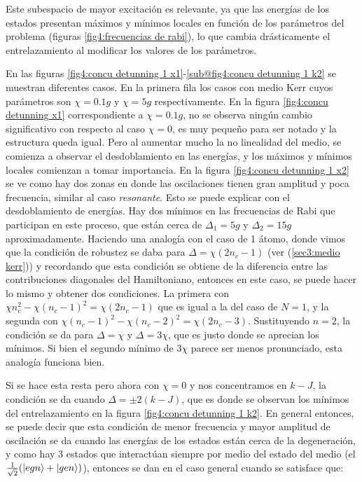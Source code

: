 Este subespacio de mayor excitación es relevante, ya que las energías de los estados presentan máximos y mínimos locales en función de los parámetros del problema (figuras \ref{fig4:frecuencias de rabi}), lo que cambia drásticamente el entrelazamiento al modificar los valores de los parámetros.

En las figuras \ref{fig4:concu detunning 1 x1}-\ref{sub@fig4:concu detunning 1 k2} se muestran diferentes casos. En la primera fila los casos con medio Kerr cuyos parámetros son $\chi=0.1g$ y $\chi=5g$ respectivamente. En la figura \ref{fig4:concu detunning x1} correspondiente a $\chi=0.1g$, no se observa ningún cambio significativo con respecto al caso $\chi=0$, es muy pequeño para ser notado y la estructura queda igual. Pero al aumentar mucho la no linealidad del medio, se comienza a observar el desdoblamiento en las energías, y los máximos y mínimos locales comienzan a tomar importancia. En la figura \ref{fig4:concu detunning 1 x2} se ve como hay dos zonas en donde las oscilaciones tienen gran amplitud y poca frecuencia, similar al caso \textit{resonante}. Esto se puede explicar con el desdoblamiento de energías. Hay dos mínimos en las frecuencias de Rabi que participan en este proceso, que están cerca de $\Delta_1=5g$ y $\Delta_2=15g$ aproximadamente. Haciendo una analogía con el caso de 1 átomo, donde vimos que la condición de robustez se daba para $\Delta=\chi(2n_c-1)$ (ver (\ref{sec3:medio kerr})) y recordando que esta condición se obtiene de la diferencia entre las contribuciones diagonales del Hamiltoniano, entonces en este caso, se puede hacer lo mismo y obtener dos condiciones. La primera con $\chi n_c^2-\chi(n_c-1)^2=\chi(2n_c-1)$ que es igual a la del caso de $N=1$, y la segunda con $\chi(n_c-1)^2-\chi(n_c-2)^2=\chi(2n_c-3)$. Sustituyendo $n=2$, la condición se da para $\Delta=\chi$ y $\Delta=3\chi$, que es justo donde se aprecian los mínimos. Si bien el segundo mínimo de $3\chi$ parece ser menos pronunciado, esta analogía funciona bien.

Si se hace esta resta pero ahora con $\chi=0$ y nos concentramos en $k-J$, la condición se da cuando $\Delta=\pm 2(k-J)$, que es donde se observan los mínimos del entrelazamiento en la figura \ref{fig4:concu detunning 1 k2}. En general entonces, se puede decir que esta condición de menor frecuencia y mayor amplitud de oscilación se da cuando las energías de los estados están cerca de la degeneración, y como hay 3 estados que interactúan siempre por medio del estado del medio (el $\frac{1}{\sqrt{2}}(\ket{egn}+\ket{gen})$), entonces se dan en el caso general cuando se satisface que:

